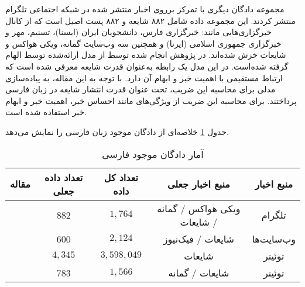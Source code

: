 \citet{jahanbakhsh2020model}  مجموعه دادگان دیگری با تمرکز برروی اخبار منتشر شده در شبکه‌ اجتماعی تلگرام منتشر کردند. این مجموعه داده شامل ۸۸۲ شایعه و ۸۸۲ پست اصیل است که از کانال‌ خبرگزاری‌هایی مانند: خبرگزاری فارس، دانشجویان ایران (ایسنا)، تسنیم، مهر و خبرگزاری جمهوری اسلامی (ایرنا) و همچنین سه وب‌سایت گمانه، ویکی هواکس و شایعات خزش شده‌اند.
% 
در پژوهش انجام شده توسط 
\citet{jahanbakhsh2020model} 
از مدل ارائه‌شده توسط 
\citet{allport1947psychology}
الهام گرفته شده‌است. در این مدل  یک رابطه به‌عنوان قدرت شایعه معرفی شده‌ است  که ارتباط مستقیمی با اهمیت خبر و ابهام آن دارد. با توجه به این مقاله، 
\citet{jahanbakhsh2020model} 
به پیاده‌سازی مدلی برای محاسبه این ضریب، تحت عنوان قدرت انتشار شایعه در زبان فارسی پرداختند. برای محاسبه این ضریب از ویژگی‌های مانند احساس خبر، اهمیت خبر و ابهام خبر استفاده شده ‌است.

جدول \ref{table.other_datasets} خلاصه‌ای از دادگان موجود زبان فارسی را نمایش می‌دهد.

\begin{table}[!h]
	\caption{آمار دادگان موجود فارسی}
	\label{table.other_datasets}
	\normalsize
	\begin{center}
		\begin{tabular}{|c|c|c|c|c|}
			\hline
			مقاله & تعداد داده جعلی & تعداد کل داده & منبع اخبار جعلی & منبع اخبار \\
			\hline
			\hline
			\cite{jahanbakhsh2020model} & 
			882 & $1,764$ & ویکی هواکس / گمانه / شایعات & تلگرام \\
			\hline
			\cite{zarharan2019persian} & 
			600 & $2,124$ & شایعات / فیک‌نیوز & وب‌سایت‌ها \\
			\hline
			\cite{mahmoodabad2018persian} & 
			$4,345$ & $3,598,049$ & شایعات & توئیتر \\
			\hline
			\cite{zamani2017rumor} & 
			783 & $1,566$ & شایعات / گمانه & توئیتر \\
			\hline
			
		\end{tabular}
	\end{center}
\end{table}
